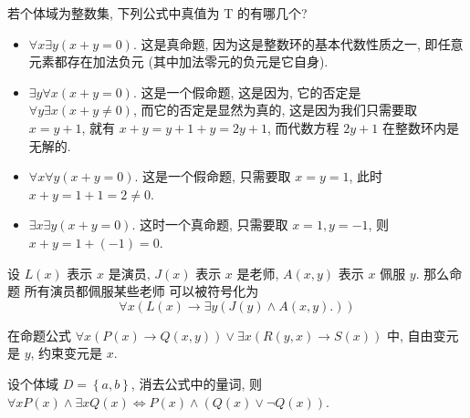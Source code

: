 \documentclass[10pt,UTF8]{book} %
\begin{document}
\begin{exercise}
    若个体域为整数集, 下列公式中真值为 T 的有哪几个?
    \begin{itemize}[itemsep=0pt]
        \item $\forall x \exists y (x+y = 0)$. 这是真命题,
        因为这是整数环的基本代数性质之一, 即{\kaishu 任意元素都存在加法负元} (其中加法零元的负元是它自身).
        \item $\exists y \forall x \left( x+y = 0 \right)$.
        这是一个假命题, 这是因为, 它的否定是 $\forall y \exists x \left( x+y \ne 0 \right)$,
        而它的否定是显然为真的, 这是因为我们只需要取 $x = y+1$, 就有
        $x+y = y+1+y = 2y+1$, 而代数方程 $2y+1$ 在整数环内是无解的.
        \item $\forall x \forall y \left( x+y = 0 \right)$.
        这是一个假命题, 只需要取 $x=y=1$, 此时 $x+y = 1+1=2 \ne 0$.
        \item $\exists x \exists y \left( x+y = 0 \right)$.
        这时一个真命题, 只需要取 $x = 1, y = -1$, 则 $x+y = 1+(-1) = 0$.
    \end{itemize}
\end{exercise}

\begin{exercise}
    设 $L(x)$ 表示 $x$ 是演员, $J(x)$ 表示 $x$ 是老师, $A(x,y)$ 表示 $x$ 佩服 $y$.
    那么命题 {\kaishu 所有演员都佩服某些老师} 可以被符号化为
    \[ \forall x \left( L(x) \to \exists y \left(
        J(y) \wedge A(x,y).
    \right) \right) \]
\end{exercise}

\begin{exercise}
    在命题公式 $\forall x \left(
        P(x) \to Q(x,y)
    \right) \vee \exists x \left(
        R(y,x) \to S(x)
    \right)$ 中, 自由变元是 $y$, 约束变元是 $x$.
\end{exercise}

\begin{exercise}
    设个体域 $D = \left\{a,b\right\}$, 消去公式中的量词,
    则 $\forall x P(x) \wedge \exists x Q(x) \iff P(x) \wedge \left(
        Q(x) \vee \lnot Q(x)
    \right)$.
\end{exercise}
\end{document}
